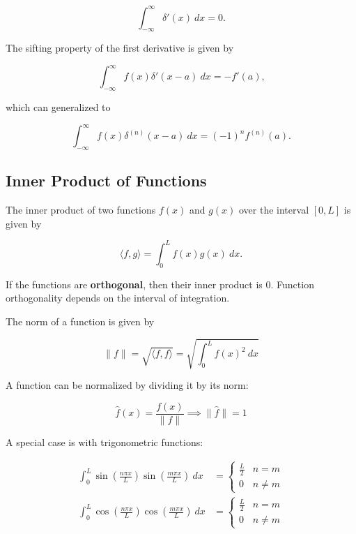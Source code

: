 \begin{equation*}
    \int_{-\infty}^\infty \delta'(x)~dx = 0\text{.}
\end{equation*}

The sifting property of the first derivative is given by

\begin{equation*}
    \int_{-\infty}^\infty f(x)\delta'(x-a)~dx = -f'(a)\text{,}
\end{equation*}

which can generalized to

\begin{equation*}
    \int_{-\infty}^\infty f(x)\delta^{(n)}(x-a)~dx = (-1)^n f^{(n)}(a)\text{.}
\end{equation*}

\subsection{Inner Product of Functions}

The inner product of two functions $f(x)$ and $g(x)$ over the interval $[0, L]$ is given by

\begin{equation*}
    \langle f, g \rangle = \int_0^L f(x)g(x)~dx\text{.}
\end{equation*}

If the functions are \textbf{orthogonal}, then their inner product is 0. Function orthogonality depends on the interval of integration.

\vsp

The norm of a function is given by

\begin{equation*}
    \|f\| = \sqrt{\langle f, f \rangle} = \sqrt{\int_0^L f(x)^2~dx}
\end{equation*}

A function can be normalized by dividing it by its norm:

\begin{equation*}
    \hat{f}(x) = \frac{f(x)}{\|f\|} \implies \|\hat{f}\| = 1
\end{equation*}

A special case is with trigonometric functions:

\begin{align*}
    \int_0^L \sin(\frac{n\pi x}{L})\sin(\frac{m\pi x}{L})~dx & = \begin{cases} \frac{L}{2} & n = m \\ 0 & n \neq m  \end{cases} \\
    \int_0^L \cos(\frac{n\pi x}{L})\cos(\frac{m\pi x}{L})~dx & = \begin{cases} \frac{L}{2} & n = m \\ 0 & n \neq m \end{cases}
\end{align*}
